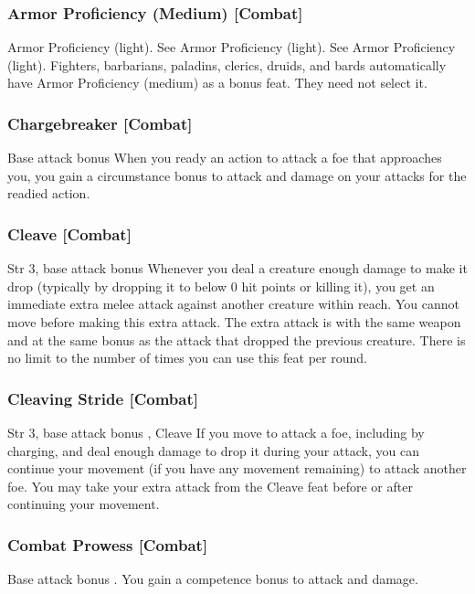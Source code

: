 \subsubsection{Armor Proficiency (Medium) [Combat]}
 Armor Proficiency (light).
 See Armor Proficiency (light).
 See Armor Proficiency (light).
 Fighters, barbarians, paladins, clerics, druids, and bards automatically have Armor Proficiency (medium) as a bonus feat. They need not select it.

\subsubsection{Chargebreaker [Combat]}
 Base attack bonus 
 When you ready an action to attack a foe that approaches you, you gain a  circumstance bonus to attack and damage on your attacks for the readied action.

\subsubsection{Cleave [Combat]}
 Str 3, base attack bonus 
 Whenever you deal a creature enough damage to make it drop (typically by dropping it to below 0 hit points or killing it), you get an immediate extra melee attack against another creature within reach. You cannot move before making this extra attack. The extra attack is with the same weapon and at the same bonus as the attack that dropped the previous creature. There is no limit to the number of times you can use this feat per round.

\subsubsection{Cleaving Stride [Combat]}
 Str 3, base attack bonus , Cleave
 If you move to attack a foe, including by charging, and deal enough damage to drop it during your attack, you can continue your movement (if you have any movement remaining) to attack another foe. You may take your extra attack from the Cleave feat before or after continuing your movement.

\subsubsection{Combat Prowess [Combat]}
\featpre Base attack bonus .
\featben You gain a  competence bonus to attack and damage.

